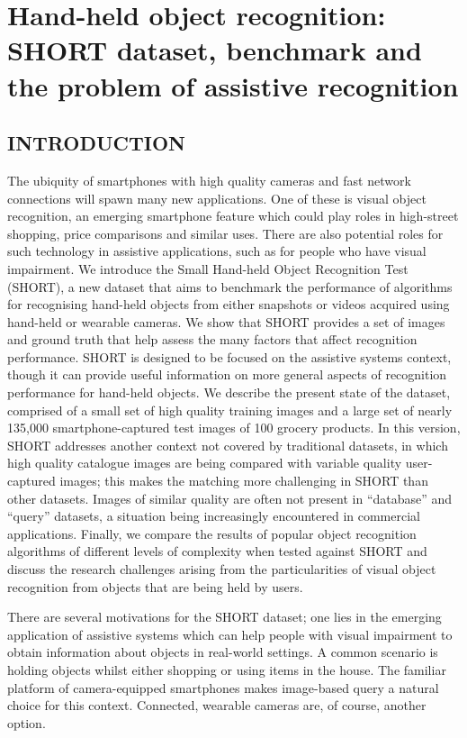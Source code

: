\chapter{Hand-held object recognition: SHORT dataset, benchmark and the problem of assistive recognition}\label{ch:chapter3}


\section{INTRODUCTION}
\label{sec:intro}

The ubiquity of smartphones with high quality cameras and fast network connections will spawn many new applications. One of these is visual object recognition, an emerging smartphone feature which could play roles in high-street shopping, price comparisons and similar uses. There are also potential roles for such technology in assistive applications, such as for people who have visual impairment. We introduce the Small Hand-held Object Recognition Test (SHORT), a new dataset that aims to benchmark the performance of algorithms for recognising hand-held objects from either snapshots or videos acquired using hand-held or wearable cameras. We show that SHORT provides a set of images and ground truth that help assess the many factors that affect recognition performance. SHORT is designed to be focused on the assistive systems context, though it can provide useful information on more general aspects of recognition performance for hand-held objects. We describe the present state of the dataset, comprised of a small set of high quality training images and a large set of nearly 135,000 smartphone-captured test images of 100 grocery products. In this version, SHORT addresses another context not covered by traditional datasets, in which high quality catalogue images are being compared with variable quality user-captured images; this makes the matching more challenging in SHORT than other datasets. Images of similar quality are often not present in ``database'' and ``query'' datasets, a situation being increasingly encountered in commercial applications. Finally, we compare the results of popular object recognition algorithms of different levels of complexity when tested against SHORT and discuss the research challenges arising from the particularities of visual object recognition from objects that are being held by users.


There are several motivations for the SHORT dataset; one lies in the emerging application of assistive systems which can help people with visual impairment to obtain information about objects in real-world settings. A common scenario is holding objects whilst either shopping or using items in the house. The familiar platform of camera-equipped smartphones makes image-based query a natural choice for this context. Connected, wearable cameras are, of course, another option.

